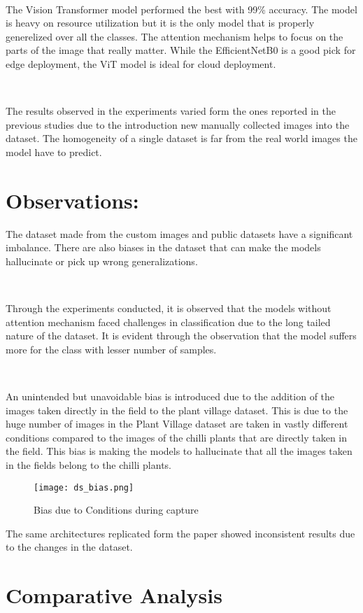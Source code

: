 \

The Vision Transformer model performed the best with 99\% accuracy. The model is heavy on resource utilization but it is the only model that is properly generelized over all the classes. The attention mechanism helps to focus on the parts of the image that really matter. While the EfficientNetB0 is a good pick for edge deployment, the ViT model is ideal for cloud deployment.

\

The results observed in the experiments varied form the ones reported in the previous studies due to the introduction new manually collected images into the dataset. The homogeneity of a single dataset is far from the real world images the model have to predict.

\section{Observations:} 
The dataset made from the custom images and public datasets have a significant imbalance. There are also biases in the dataset that can make the models hallucinate or pick up wrong generalizations.

\

Through the experiments conducted, it is observed that the models without attention mechanism faced challenges in classification due to the long tailed nature of the dataset. It is evident through the observation that the model suffers more for the class with lesser number of samples.

\

An unintended but unavoidable bias is introduced due to the addition of the images taken directly in the field to the plant village dataset. This is due to the huge number of images in the Plant Village dataset are taken in vastly different conditions compared to the images of the chilli plants that are directly taken in the field. This bias is making the models to hallucinate that all the images taken in the fields belong to the chilli plants.

\begin{figure}[h!]
    \centering
    \texttt{[image: ds\_bias.png]}
    \caption{Bias due to Conditions during capture}
    \label{fig:ds_bias}
\end{figure}

The same architectures replicated form the paper showed inconsistent results due to the changes in the dataset.

\section{ Comparative Analysis}

